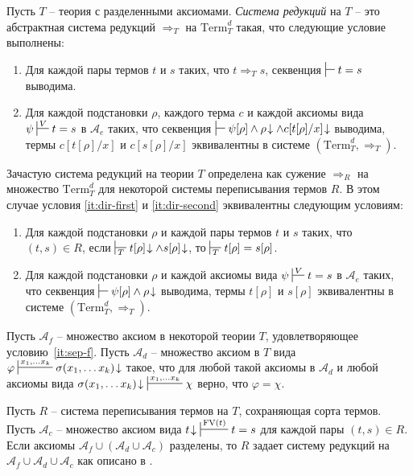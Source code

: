\documentclass[reqno]{amsart}
\theoremstyle{definition}
\theoremstyle{remark}
\newcommand{\fs}[1]{\mathrm{#1}}
\newcommand{\FV}{\fs{FV}}
\newcommand{\Term}{\mathrm{Term}}
\begin{document}
\begin{defn}[directed]
Пусть $T$ -- теория с разделенными аксиомами.
\emph{Система редукций} на $T$ -- это абстрактная система редукций $\Rightarrow_T$ на $\Term^d_T$ такая, что следующие условие выполнены:
\begin{enumerate}
\item \label{it:dir-first} Для каждой пары термов $t$ и $s$ таких, что $t \Rightarrow_T s$, секвенция $\sststile{}{} t = s$ выводима.
\item \label{it:dir-second} Для каждой подстановки $\rho$, каждого терма $c$ и каждой аксиомы вида $\psi \sststile{}{V} t = s$ в $\mathcal{A}_e$ таких,
что секвенция $\sststile{}{} \psi[\rho] \land \rho\!\downarrow \land c[t[\rho]/x]\!\downarrow$ выводима,
термы $c[t[\rho]/x]$ и $c[s[\rho]/x]$ эквивалентны в системе $(\Term_T^d,\Rightarrow_T)$.
\end{enumerate}
\end{defn}

\begin{remark}
Зачастую система редукций на теории $T$ определена как сужение $\Rightarrow_R$ на множество $\Term^d_T$ для некоторой системы переписывания термов $R$.
В этом случае условия \eqref{it:dir-first} и \eqref{it:dir-second} эквивалентны следующим условиям:
\begin{enumerate}
\item \label{it:trs-dir-first} Для каждой подстановки $\rho$ и каждой пары термов $t$ и $s$ таких, что $(t,s) \in R$, если $\sststile{T}{} t[\rho]\!\downarrow \land s[\rho]\!\downarrow$, то $\sststile{T}{} t[\rho] = s[\rho]$.
\item \label{it:trs-dir-second} Для каждой подстановки $\rho$ и каждой аксиомы вида $\psi \sststile{}{V} t = s$ в $\mathcal{A}_e$ таких,
что секвенция $\sststile{}{} \psi[\rho] \land \rho\!\downarrow$ выводима, термы $t[\rho]$ и $s[\rho]$ эквивалентны в системе $(\Term_T^d,\Rightarrow_T)$.
\end{enumerate}
\end{remark}

\begin{example}[dir-ax]
Пусть $\mathcal{A}_f$ -- множество аксиом в некоторой теории $T$, удовлетворяющее условию~\eqref{it:sep-f}.
Пусть $\mathcal{A}_d$ -- множество аксиом в $T$ вида $\varphi \sststile{}{x_1, \ldots x_k} \sigma(x_1, \ldots x_k)\!\downarrow$ такое,
что для любой такой аксиомы в $\mathcal{A}_d$ и любой аксиомы вида $\sigma(x_1, \ldots x_k)\!\downarrow\ \sststile{}{x_1, \ldots x_k} \chi$ верно, что $\varphi = \chi$.

Пусть $R$ -- система переписывания термов на $T$, сохраняющая сорта термов.
Пусть $\mathcal{A}_c$ -- множество аксиом вида $t\!\downarrow\ \sststile{}{\FV(t)} t = s$ для каждой пары $(t,s) \in R$.
Если аксиомы $\mathcal{A}_f \cup (\mathcal{A}_d \cup \mathcal{A}_c)$ разделены, то $R$ задает систему редукций на $\mathcal{A}_f \cup \mathcal{A}_d \cup \mathcal{A}_c$ как описано в .
\end{example}
\end{document}
